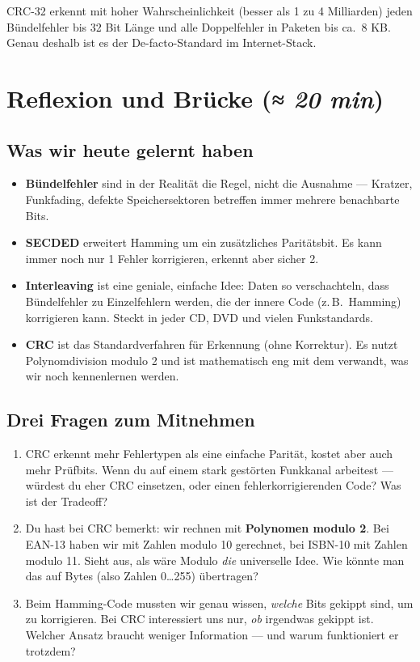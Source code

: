 CRC-32 erkennt mit hoher Wahrscheinlichkeit (besser als 1 zu 4
Milliarden) jeden Bündelfehler bis 32 Bit Länge und alle Doppelfehler
in Paketen bis ca.\ 8 KB. Genau deshalb ist es der De-facto-Standard
im Internet-Stack.

\section{Reflexion und Brücke \normalfont(\textit{≈ 20 min})}

\subsection*{Was wir heute gelernt haben}

\begin{itemize}
\item \textbf{Bündelfehler} sind in der Realität die Regel, nicht die
  Ausnahme — Kratzer, Funkfading, defekte Speichersektoren betreffen
  immer mehrere benachbarte Bits.
\item \textbf{SECDED} erweitert Hamming um ein zusätzliches
  Paritätsbit. Es kann immer noch nur 1 Fehler korrigieren, erkennt
  aber sicher 2.
\item \textbf{Interleaving} ist eine geniale, einfache Idee: Daten so
  verschachteln, dass Bündelfehler zu Einzelfehlern werden, die der
  innere Code (z.\,B.\ Hamming) korrigieren kann. Steckt in jeder CD,
  DVD und vielen Funkstandards.
\item \textbf{CRC} ist das Standardverfahren für Erkennung (ohne
  Korrektur). Es nutzt Polynomdivision modulo 2 und ist mathematisch
  eng mit dem verwandt, was wir noch kennenlernen werden.
\end{itemize}

\subsection*{Drei Fragen zum Mitnehmen}

\begin{enumerate}
\item CRC erkennt mehr Fehlertypen als eine einfache Parität, kostet
  aber auch mehr Prüfbits. Wenn du auf einem stark gestörten Funkkanal
  arbeitest — würdest du eher CRC einsetzen, oder einen
  fehlerkorrigierenden Code? Was ist der Tradeoff?
\item Du hast bei CRC bemerkt: wir rechnen mit \textbf{Polynomen
  modulo 2}. Bei EAN-13 haben wir mit Zahlen modulo 10 gerechnet,
  bei ISBN-10 mit Zahlen modulo 11. Sieht aus, als wäre Modulo
  \emph{die} universelle Idee. Wie könnte man das auf Bytes (also
  Zahlen 0\ldots255) übertragen?
\item Beim Hamming-Code mussten wir genau wissen, \emph{welche} Bits
  gekippt sind, um zu korrigieren. Bei CRC interessiert uns nur,
  \emph{ob} irgendwas gekippt ist. Welcher Ansatz braucht weniger
  Information — und warum funktioniert er trotzdem?
\end{enumerate}

